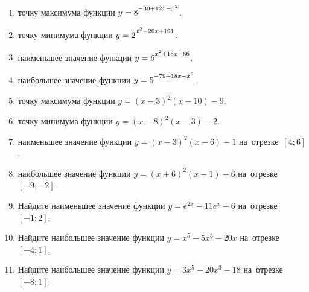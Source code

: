 \documentclass[a4paper,10pt]{article}
\begin{document}
\begin{enumerate}
\item {} точку максимума функции $y=8\strut^{-30+12x-x^2}$.

\item {} точку минимума функции $y=2\strut^{x^2-26x+191}$.

\item {} наименьшее значение функции $y=6\strut^{x^2+16x+66}$.

\item {} наибольшее значение функции $y=5\strut^{-79+18x-x^2}$.

\item {} точку максимума функции $y=\left(x-3\right)^2\left(x-10\right)-9$.

\item {} точку минимума функции $y=\left(x-8\right)^2\left(x-3\right)-2$.

\item {} наименьшее значение функции $y=\left(x-3\right)^2\left(x-6\right)-1$ на~отрезке~$\left[4;6\right]$.

\item {} наибольшее значение функции $y=\left(x+6\right)^2\left(x-1\right)-6$ на~отрезке~$\left[-9;-2\right]$.

\item Найдите наименьшее значение функции $y=e^{2x}-11e^x-6$ на~отрезке~$\left[-1;2\right]$.

\item Найдите наибольшее значение функции $y=x^5-5x^3-20x$ на~отрезке~$\left[-4;1\right]$.

\item Найдите наибольшее значение функции $y=3x^5-20x^3-18$ на~отрезке~$\left[-8;1\right]$.

\end{enumerate}
\end{document}
